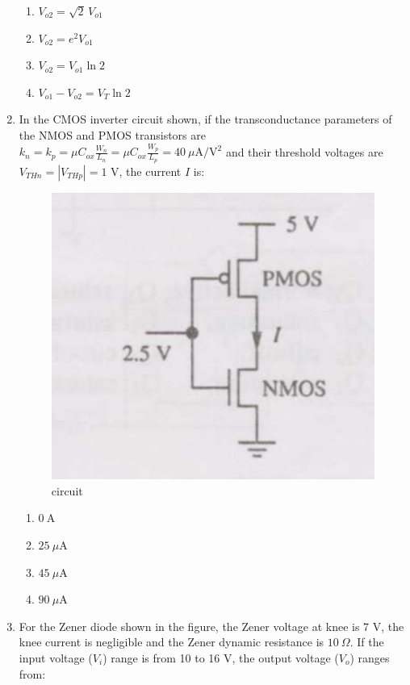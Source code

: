 \documentclass[journal,12pt,onecolumn]{IEEEtran}
\theoremstyle{remark}
\begin{document}
\begin{enumerate}
\hfill{}
\begin{enumerate}
  \item $V_{o2} = \sqrt{2}\,V_{o1}$
  \item $V_{o2} = e^2 V_{o1}$
  \item $V_{o2} = V_{o1} \ln 2$
  \item $V_{o1} - V_{o2} = V_T \ln 2$
\end{enumerate}

\item In the CMOS inverter circuit shown, if the transconductance parameters of the NMOS and PMOS transistors are $k_n = k_p = \mu C_{ox}\frac{W_n}{L_n} = \mu C_{ox}\frac{W_p}{L_p} = 40~\mu\text{A}/\text{V}^2$ and their threshold voltages are $V_{THn} = |V_{THp}| = 1\text{ V}$, the current $I$ is: 

\begin{figure}[H]
    \centering
    \includegraphics[width=0.4\linewidth]{Q39.jpg}
    \caption{circuit}
    \label{fig:full_wave}
\end{figure}
\hfill{}

\begin{multicols}{4}
\begin{enumerate}[label=(\Alph*)]
  \item $0~\text{A}$
  \item $25~\mu\text{A}$
  \item $45~\mu\text{A}$
  \item $90~\mu\text{A}$
\end{enumerate}
\end{multicols}

\item For the Zener diode shown in the figure, the Zener voltage at knee is 7 V, the knee current is negligible and the Zener dynamic resistance is $10~\Omega$. If the input voltage ($V_i$) range is from 10 to 16 V, the output voltage ($V_o$) ranges from: 


\end{enumerate}
\end{document}
